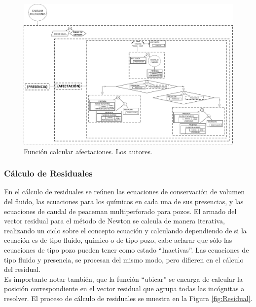 \begin{figure}[h]
	\centering%
	\includegraphics[width=\linewidth]{Fig/CalcularAfectaciones.pdf}%
	\caption[Función calcular afectaciones.]{Función calcular afectaciones. Los autores.} \label{fig:CalcularAfectaciones}
\end{figure}

\subsubsection{Cálculo de Residuales}\label{subsec:Residual}
En el cálculo de residuales se reúnen las ecuaciones de conservación de volumen del fluido, las ecuaciones para los químicos en cada una de sus presencias, y las ecuaciones de caudal de peaceman multiperforado para pozos. El armado del vector residual para el método de Newton se calcula de manera iterativa, realizando un ciclo sobre el concepto ecuación y calculando dependiendo de si la ecuación es de tipo fluido, químico o de tipo pozo, cabe aclarar que sólo las ecuaciones de tipo pozo pueden tener como estado ``Inactivas''. Las ecuaciones de tipo fluido y presencia, se procesan del mismo modo, pero difieren en el cálculo del residual.\\

Es importante notar también, que la función ``ubicar'' se encarga de calcular la posición correspondiente en el vector residual que agrupa todas las incógnitas a resolver. El proceso de cálculo de residuales se muestra en la Figura \ref{fig:Residual}. \\ %

